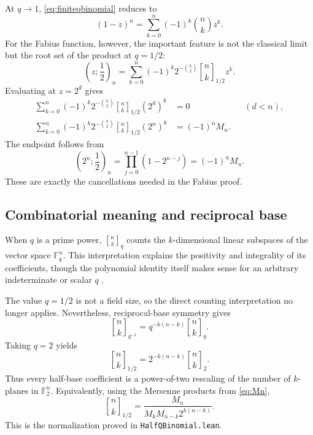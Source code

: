 \documentclass[11pt,oneside]{article}
\theoremstyle{definition}
\theoremstyle{remark}
\newcommand{\qpoch}[3]{\left(#1;#2\right)_{#3}}
\newcommand{\qbinom}[3]{{\genfrac{[}{]}{0pt}{}{#1}{#2}}_{#3}}
\newcommand{\halfqbinom}[2]{{\genfrac{[}{]}{0pt}{}{#1}{#2}}_{1/2}}
\begin{document}
At $q\to1$, \eqref{eq:finiteqbinomial} reduces to
\[
 (1-z)^n=\sum_{k=0}^{n}(-1)^k\binom nkz^k.
\]
For the Fabius function, however, the important feature is not the classical limit but the root set of the product at $q=1/2$:
\begin{equation}\label{eq:finitehalf}
 \qpoch{z}{\frac12}{n}
 =\sum_{k=0}^{n}(-1)^k2^{-\binom{k}{2}}
   \halfqbinom{n}{k}z^k.
\end{equation}
Evaluating at $z=2^d$ gives
\begin{align}
 \sum_{k=0}^{n}(-1)^k2^{-\binom{k}{2}}
   \halfqbinom{n}{k}(2^d)^k&=0 &&(d<n),
 \label{eq:verticalzero}\\
 \sum_{k=0}^{n}(-1)^k2^{-\binom{k}{2}}
   \halfqbinom{n}{k}(2^n)^k
 &=(-1)^nM_n.
 \label{eq:verticalendpoint}
\end{align}
The endpoint follows from
\[
 \qpoch{2^n}{\frac12}{n}
 =\prod_{j=0}^{n-1}(1-2^{n-j})
 =(-1)^nM_n.
\]
These are exactly the cancellations needed in the Fabius proof.

\subsection{Combinatorial meaning and reciprocal base}

When $q$ is a prime power, $\qbinom{n}{k}{q}$ counts the $k$-dimensional linear subspaces of the vector space $\mathbb F_q^n$.  This interpretation explains the positivity and integrality of its coefficients, though the polynomial identity itself makes sense for an arbitrary indeterminate or scalar $q$ \cite{Andrews,Stanley}.

The value $q=1/2$ is not a field size, so the direct counting interpretation no longer applies.  Nevertheless, reciprocal-base symmetry gives
\begin{equation}\label{eq:reciprocalqbin}
 \qbinom{n}{k}{q^{-1}}
 =q^{-k(n-k)}\qbinom{n}{k}{q}.
\end{equation}
Taking $q=2$ yields
\begin{equation}\label{eq:halfvs2}
 \boxed{
 \halfqbinom{n}{k}
 =2^{-k(n-k)}\qbinom{n}{k}{2}.}
\end{equation}
Thus every half-base coefficient is a power-of-two rescaling of the number of $k$-planes in $\mathbb F_2^n$.  Equivalently, using the Mersenne products from \eqref{eq:Mn},
\begin{equation}\label{eq:halfqMersenne}
 \boxed{
 \halfqbinom{n}{k}
 =\frac{M_n}{M_kM_{n-k}2^{k(n-k)}}.}
\end{equation}
This is the normalization proved in \texttt{HalfQBinomial.lean}.
\end{document}
